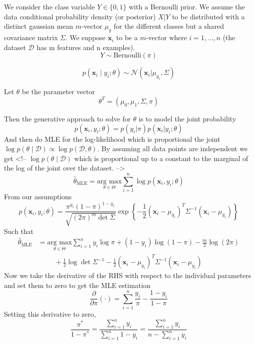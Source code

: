 \documentclass{article}
\numberwithin{equation}{section}
\begin{document}
\section{}

We consider the class variable $Y \in \{ 0, 1\}$ with a Bernoulli prior. We assume the data conditional probability density (or posterior) $X | Y$ to be distributed with a distinct gaussian mean $m$-vector $\mu_y$ for the different classes but a
shared covariance matrix $\Sigma$. We suppose $\mathbf{x}_i$ to be a $m$-vector where $i=1,\dots,n$ (the dataset $\mathcal{D}$ has m features and n examples).
$$
Y \sim \text{Bernoulli}(\pi)
$$

$$
p(\mathbf{x}_i \mid y_i; \theta) \sim \mathcal{N}(\mathbf{x}_i | \mu_{y_i} , \Sigma)
$$

Let $\theta$ be the parameter vector
$$
\theta^T = (\mu_0, \mu_1, \Sigma, \pi)
$$

Then the generative approach to solve for $\theta$ is to model the joint probability
$$
p(\mathbf{x}_i, y_i; \theta) = p(y_i | \pi) p(\mathbf{x}_i | y_i ; \theta)
$$
And then do MLE for the log-likelihood which is proportional the joint $\log p(\theta \mid \mathcal{D}) \propto \log p(\mathcal{D}, \theta)$. By assuming all data points are independent we get
<!-- $\log p(\theta \mid \mathcal{D})$ which is proportional up to a constant to the marginal of the log of the joint over the dataset.  -->
$$
\hat{\theta}_{\text{MLE}} = \underset{\theta \in \Theta}{\text{arg max}} \sum_{i = 1}^n \log p(\mathbf{x}_i , y_i ; \theta)
$$
From our assumptions
$$
p(\mathbf{x}_i , y_i ; \theta) = \frac{\pi^{y_i} (1 - \pi)^{1 - y_i}}{\sqrt{(2 \pi)^m \det{\Sigma}}} \exp \left\{-  \frac{1}{2}(\mathbf{x}_i - \mu_{y_i})^T\Sigma^{-1}(\mathbf{x}_i - \mu_{y_i} )  \right\}
$$
Such that
\begin{align}
\hat{\theta}_{\text{MLE}} &=  \underset{\theta \in \Theta}{\text{arg max}} \sum_{i = 1}^n y_i \log \pi + (1 - y_i) \log(1 - \pi) - \frac{m}{2}\log(2 \pi) \\
 &\hspace{1cm} + \frac{1}{2} \log \det{\Sigma}^{-1} - \frac{1}{2} (\mathbf{x}_i - \mu_{y_i})^T\Sigma^{-1} (\mathbf{x}_i - \mu_{y_i})
\end{align}
Now we take the derivative of the RHS with respect to the individual parameters and set them to zero to get the MLE estimation
$$
\frac{\partial }{\partial \pi} (\cdot) = \sum_{i = 1}^n \frac{y_i}{\pi} - \frac{1 - y_i}{1 - \pi}
$$
Setting this derivative to zero,
$$
\frac{\pi^*}{1 - \pi^*} = \frac{\sum_{i =1}^n y_i}{\sum_{i =1}^n 1 - y_i} =
\frac{\sum_{i = 1}^n y_i}{n - \sum_{i = 1}^n y_i}
$$
\end{document}
